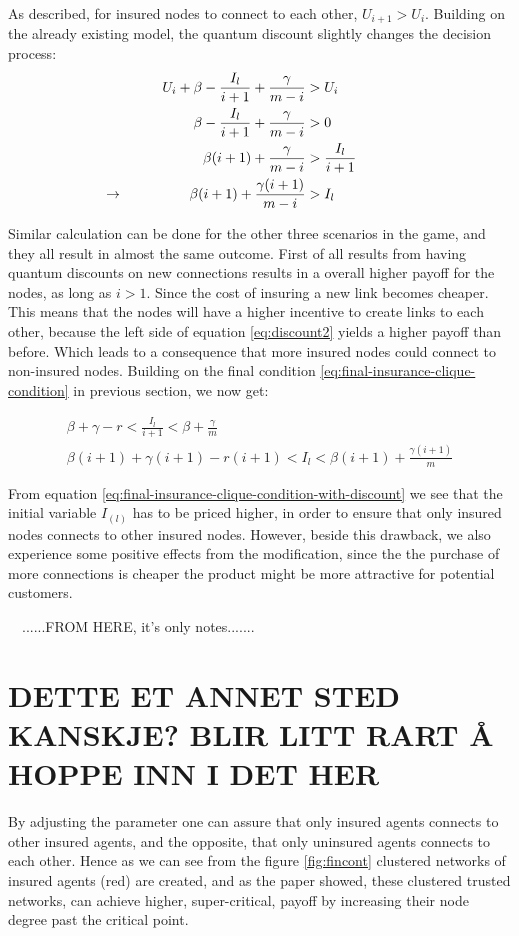 As described, for insured nodes to connect to each other, $U_{i+1} > U_{i}$. Building on the already existing model, the quantum discount slightly changes the decision process:
\begin{eqnarray}
U_{i}+\beta-\frac{I_{l}}{i+1}+\frac{\gamma}{m-i}&>U_{i} \nonumber \\ 
\beta-\frac{I_{l}}{i+1}+\frac{\gamma}{m-i}&>0 \nonumber \\ 
\beta (i+1)+\frac{\gamma}{m-i}&>\frac{I_{l}}{i+1} \nonumber \\
\llap{$\rightarrow$\hspace{50pt}}  \beta (i+1)+\frac{\gamma (i+1)}{m-i}&>I_{l}
\label{eq:discount2}
\end{eqnarray}

Similar calculation can be done for the other three scenarios in the game, and they all result in almost the same outcome. First of all results from having quantum discounts on new connections results in a overall higher payoff for the nodes, as long as $i>1$. Since the cost of insuring a new link becomes cheaper. This means that the nodes will have a higher incentive to create links to each other, because the left side of equation \ref{eq:discount2} yields a higher payoff than before. Which leads to a consequence that more insured nodes could connect to non-insured nodes. 
Building on the final condition \ref{eq:final-insurance-clique-condition} in previous section, we now get:

\begin{eqnarray}
\beta+\gamma-r<\frac{I_{l}}{i+1}<\beta+\frac{\gamma}{m} \nonumber \\
\beta(i+1)+\gamma(i+1)-r(i+1)<I_{l}<\beta(i+1)+\frac{\gamma(i+1)}{m}
\label{eq:final-insurance-clique-condition-with-discount}
\end{eqnarray}

From equation \ref{eq:final-insurance-clique-condition-with-discount} we see that the initial variable $I_(l)$ has to be priced higher, in order to ensure that only insured nodes connects to other insured nodes. However, beside this drawback, we also experience some positive effects from the modification, since the the purchase of more connections is cheaper the product might be more attractive for potential customers. 

\
\
......FROM HERE, it's only notes.......

\section{DETTE ET ANNET STED KANSKJE? BLIR LITT RART Å HOPPE INN I DET HER}
By adjusting the parameter one can assure that only insured agents connects to other insured agents, and the opposite,
that only uninsured agents connects to each other. Hence as we can see from the figure \ref{fig:fincont} clustered
networks of insured agents (red) are created, and  as the paper \cite{contagion} showed, these clustered trusted
networks, can achieve higher, super-critical, payoff by increasing their node degree past the critical point.

